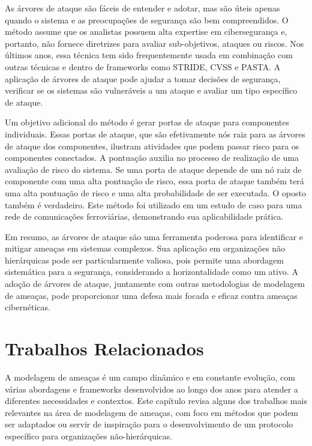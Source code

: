 As árvores de ataque são fáceis de entender e adotar, mas são úteis apenas
quando o sistema e as preocupações de segurança são bem compreendidos. O método
assume que os analistas possuem alta expertise em cibersegurança e, portanto, não
fornece diretrizes para avaliar sub-objetivos, ataques ou riscos.
Nos últimos anos, essa técnica tem sido frequentemente usada em combinação com
outras técnicas e dentro de frameworks como STRIDE, CVSS e PASTA.
A aplicação de árvores de ataque pode ajudar a tomar decisões de segurança,
verificar se os sistemas são vulneráveis a um ataque e avaliar um tipo específico de
ataque. 

Um objetivo adicional do método é gerar portas de ataque para componentes
individuais. Essas portas de ataque, que são efetivamente nós raiz para as árvores de
ataque dos componentes, ilustram atividades que podem passar risco para os
componentes conectados. A pontuação auxilia no processo de realização de uma avaliação de
risco do sistema. Se uma porta de ataque depende de um nó raiz de componente com uma
alta pontuação de risco, essa porta de ataque também terá uma alta pontuação de
risco e uma alta probabilidade de ser executada. O oposto também é verdadeiro.
Este método foi utilizado em um estudo de caso para uma rede de comunicações
ferroviárias, demonstrando sua aplicabilidade prática. 

Em resumo, as árvores de ataque são uma ferramenta poderosa para identificar e
mitigar ameaças em sistemas complexos. Sua aplicação em organizações não hierárquicas
pode ser particularmente valiosa, pois permite uma abordagem sistemática para a
segurança, considerando a horizontalidade como um ativo. A adoção de árvores de ataque,
juntamente com outras metodologias de modelagem de ameaças, pode proporcionar uma defesa
mais focada e eficaz contra ameaças cibernéticas. 



\section{Trabalhos Relacionados}
\label{sec:introduction}

A modelagem de ameaças é um campo dinâmico e em constante evolução, com várias
abordagens e frameworks desenvolvidos ao longo dos anos para atender a diferentes
necessidades e contextos. Este capítulo revisa alguns dos trabalhos mais relevantes na área
de modelagem de ameaças, com foco em métodos que podem ser adaptados ou servir de
inspiração para o desenvolvimento de um protocolo específico para organizações
não-hierárquicas. 

